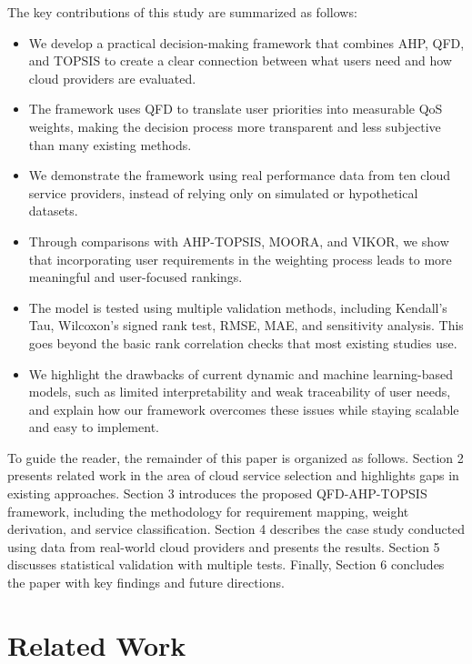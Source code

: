 \documentclass[twocolumn]{svjour3}
\begin{document}
The key contributions of this study are summarized as follows:
\begin{itemize}
    \item We develop a practical decision-making framework that combines AHP, QFD, and TOPSIS to create a clear connection between what users need and how cloud providers are evaluated.
    \item The framework uses QFD to translate user priorities into measurable QoS weights, making the decision process more transparent and less subjective than many existing methods.
    \item We demonstrate the framework using real performance data from ten cloud service providers, instead of relying only on simulated or hypothetical datasets.
    \item Through comparisons with AHP-TOPSIS, MOORA, and VIKOR, we show that incorporating user requirements in the weighting process leads to more meaningful and user-focused rankings.
    \item The model is tested using multiple validation methods, including Kendall's Tau, Wilcoxon's signed rank test, RMSE, MAE, and sensitivity analysis. This goes beyond the basic rank correlation checks that most existing studies use.
    \item We highlight the drawbacks of current dynamic and machine learning-based models, such as limited interpretability and weak traceability of user needs, and explain how our framework overcomes these issues while staying scalable and easy to implement.
\end{itemize}


To guide the reader, the remainder of this paper is organized as follows. Section 2 presents related work in the area of cloud service selection and highlights gaps in existing approaches. Section 3 introduces the proposed QFD-AHP-TOPSIS framework, including the methodology for requirement mapping, weight derivation, and service classification. Section 4 describes the case study conducted using data from real-world cloud providers and presents the results. Section 5 discusses statistical validation with multiple tests. Finally, Section 6 concludes the paper with key findings and future directions.

\section{Related Work}
\end{document}
